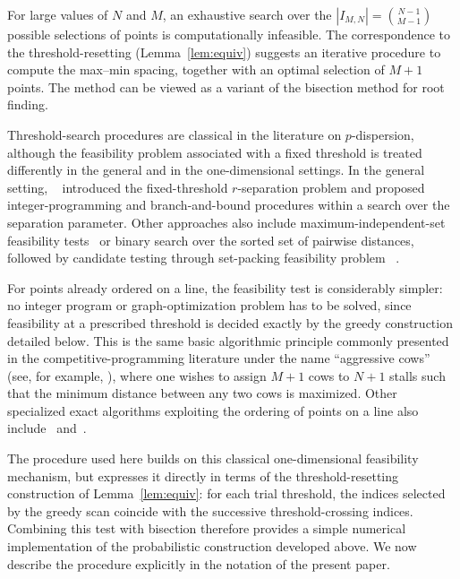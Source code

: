 \documentclass[a4paper,reqno,11pt]{amsart}
\numberwithin{equation}{section}
\numberwithin{thm}{section}
\theoremstyle{plain}
\theoremstyle{definition}
\begin{document}
{For large values of $N$ and $M$, an exhaustive search over the
$|I_{M,N}|=\binom{N-1}{M-1}$ possible selections of points is computationally
infeasible. The correspondence to the  threshold-resetting (Lemma~\ref{lem:equiv}) suggests an iterative
procedure to compute the max--min spacing, together with an optimal selection
of $M+1$ points. The method
can be viewed as a variant of the bisection method for root finding.
{Threshold-search procedures are classical in the literature on $p$-dispersion, although the feasibility problem associated with a fixed threshold is treated differently in the general and in the one-dimensional settings. In the general setting, ~\cite{Erkut1990} introduced the fixed-threshold $r$-separation problem and proposed integer-programming and
branch-and-bound procedures within a search over the separation parameter. Other approaches also include maximum-independent-set feasibility
tests~\cite{SayahIrnich2017} or binary search over the sorted set of
pairwise distances, followed by candidate testing through set-packing feasibility problem ~\cite{FrancoUchoa2015}.

For points already ordered on a line, the feasibility test is considerably simpler: no integer program or graph-optimization problem has to be solved, since feasibility at a prescribed threshold is decided exactly by the greedy construction detailed below. This is the same basic algorithmic principle commonly presented in the competitive-programming literature under the name ``aggressive cows'' (see, for example, \cite{aggressiveCows}){, where one wishes to assign $M+1$ cows to $N+1$ stalls such that the minimum distance between any two cows is maximized}.
Other specialized exact algorithms exploiting the ordering of points on a line also include~\cite{RRT94} and~\cite{AkagiEtAl2018,araki2022max}.

The procedure used here builds on this classical one-dimensional
feasibility mechanism, but expresses it directly in terms of the
threshold-resetting construction of Lemma~\ref{lem:equiv}: for each
trial threshold, the indices selected by the greedy scan coincide with
the successive threshold-crossing indices. Combining this test with
bisection therefore provides a simple numerical implementation of the
probabilistic construction developed above. We now describe the
procedure explicitly in the notation of the present paper.
}

}
\end{document}
